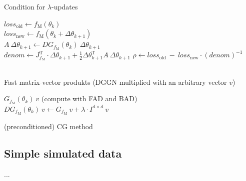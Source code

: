\documentclass[conference]{IEEEtran}
\begin{document}
\begin{algorithm}
	\caption{Condition for $\lambda$-updates}\label{alg:three}
	$loss_{\mathrm{old}}\gets f_{\mathrm{M}}(\theta_{k})$\\
	$loss_{\mathrm{new}}\gets f_{\mathrm{M}}(\theta_{k}+\Delta\theta_{k+1})$\\
	$A\:\Delta\theta_{k+1}\gets DG_{f_{\mathrm{M}}}(\theta_{k})\:\Delta\theta_{k+1}$\\
	$denom \gets J_{f_{\mathrm{M}}}^{\mathrm{T}}\cdot\Delta\theta_{k+1} + \frac{1}{2}\Delta\theta_{k+1}^{\mathrm{T}}A\:\Delta\theta_{k+1}$
	$\rho\gets loss_{\mathrm{old}}\:-\:loss_{\mathrm{new}}\cdot(denom)^{-1}$\\
	\text{}\\
	\Output{$\lambda$}
\end{algorithm}

\begin{algorithm}
	\caption{Fast matrix-vector produkts (DGGN multiplied with an arbitrary vector $v$)}\label{alg:four}
	$G_{f_{\mathrm{M}}}(\theta_{k})\:v$ (compute with FAD and BAD)\\
	$DG_{f_{\mathrm{M}}}(\theta_{k})\: v \gets G_{f_{\mathrm{M}}}\: v + \lambda\cdot I^{d\times d}\:v$\\
\end{algorithm}

\begin{algorithm}
	\caption{(preconditioned) CG method}\label{alg:five}
	
\end{algorithm}

\subsection{Simple simulated data}
...
\end{document}
